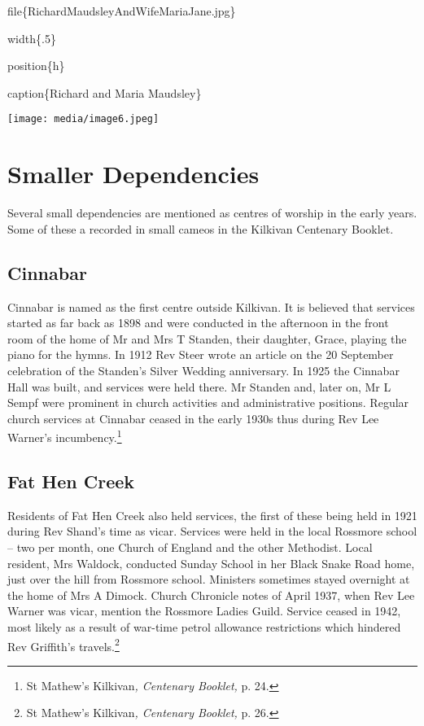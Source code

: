 file\{RichardMaudsleyAndWifeMariaJane.jpg\}

width\{.5\}

position\{h\}

caption\{Richard and Maria Maudsley\}

\texttt{[image: media/image6.jpeg]}

\hypertarget{smaller-dependencies}{%
\section{Smaller Dependencies}\label{smaller-dependencies}}

Several small dependencies are mentioned as centres of worship in the
early years. Some of these a recorded in small cameos in the Kilkivan
Centenary Booklet.

\hypertarget{cinnabar}{%
\subsection{Cinnabar}\label{cinnabar}}

Cinnabar is named as the first centre outside Kilkivan. It is believed
that services started as far back as 1898 and were conducted in the
afternoon in the front room of the home of Mr and Mrs T Standen, their
daughter, Grace, playing the piano for the hymns. In 1912 Rev Steer
wrote an article on the 20 September celebration of the Standen's Silver
Wedding anniversary. In 1925 the Cinnabar Hall was built, and services
were held there. Mr Standen and, later on, Mr L Sempf were prominent in
church activities and administrative positions. Regular church services
at Cinnabar ceased in the early 1930s thus during Rev Lee Warner's
incumbency.\footnote{St Mathew's Kilkivan\emph{, Centenary Booklet,} p.
  24.}

\hypertarget{fat-hen-creek}{%
\subsection{Fat Hen Creek}\label{fat-hen-creek}}

Residents of Fat Hen Creek also held services, the first of these being
held in 1921 during Rev Shand's time as vicar. Services were held in the
local Rossmore school -- two per month, one Church of England and the
other Methodist. Local resident, Mrs Waldock, conducted Sunday School in
her Black Snake Road home, just over the hill from Rossmore school.
Ministers sometimes stayed overnight at the home of Mrs A Dimock. Church
Chronicle notes of April 1937, when Rev Lee Warner was vicar, mention
the Rossmore Ladies Guild. Service ceased in 1942, most likely as a
result of war-time petrol allowance restrictions which hindered Rev
Griffith's travels.\footnote{St Mathew's Kilkivan\emph{, Centenary
  Booklet,} p. 26.}

